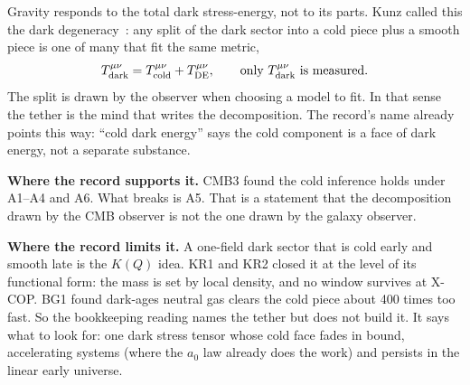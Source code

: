 \documentclass[10pt]{article}
\begin{document}
Gravity responds to the total dark stress-energy, not to its parts. Kunz called this the dark degeneracy~\cite{kunz}: any split of the dark sector into a cold piece plus a smooth piece is one of many that fit the same metric,
\begin{equation}
T^{\mu\nu}_{\rm dark}=T^{\mu\nu}_{\rm cold}+T^{\mu\nu}_{\rm DE},\qquad\text{only }T^{\mu\nu}_{\rm dark}\text{ is measured.}
\end{equation}
The split is drawn by the observer when choosing a model to fit. In that sense the tether is the mind that writes the decomposition. The record's name already points this way: ``cold dark energy'' says the cold component is a face of dark energy, not a separate substance.

\textbf{Where the record supports it.} CMB3 found the cold inference holds under A1--A4 and A6. What breaks is A5. That is a statement that the decomposition drawn by the CMB observer is not the one drawn by the galaxy observer.

\textbf{Where the record limits it.} A one-field dark sector that is cold early and smooth late is the $K(Q)$ idea. KR1 and KR2 closed it at the level of its functional form: the mass is set by local density, and no window survives at X-COP. BG1 found dark-ages neutral gas clears the cold piece about 400 times too fast. So the bookkeeping reading names the tether but does not build it. It says what to look for: one dark stress tensor whose cold face fades in bound, accelerating systems (where the $a_0$ law already does the work) and persists in the linear early universe.
\end{document}
